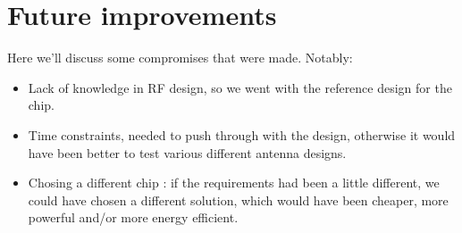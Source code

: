 \chapter{Future improvements}\label{ch:improvements}

Here we'll discuss some compromises that were made. Notably:

\begin{itemize}
  \item Lack of knowledge in RF design, so we went with the reference design for
    the chip.
  \item Time constraints, needed to push through with the design, otherwise it
    would have been better to test various different antenna designs. 
  \item Chosing a different chip : if the requirements had been a little
    different, we could have chosen a different solution, which would have been
    cheaper, more powerful and/or more energy efficient.
\end{itemize}
